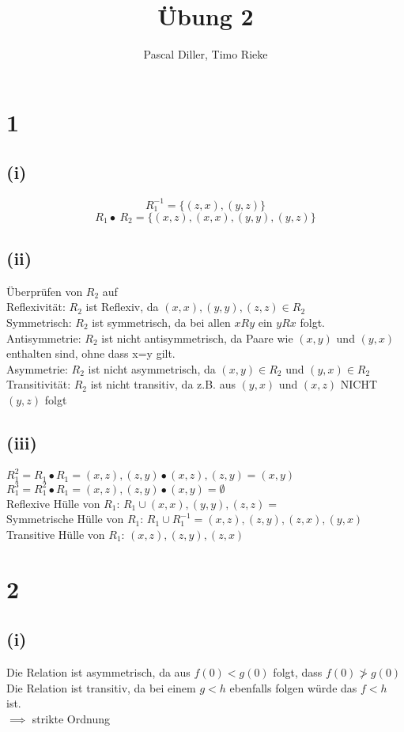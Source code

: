 \documentclass{article}
\title{Übung 2}
\author{Pascal Diller, Timo Rieke}
\begin{document}
\maketitle

\section{1}
\subsection{(i)}
\[R_1^{-1} = \{(z,x),(y,z)\}\]
\[R_1 \bullet\ R_2 = \{(x,z),(x,x),(y,y),(y,z)\}\]
\subsection{(ii)}
Überprüfen von $R_2$ auf \\
Reflexivität: 
$R_2$ ist Reflexiv, da $(x,x),(y,y),(z,z) \in R_2$ \\ 
Symmetrisch: 
$R_2$ ist symmetrisch, da bei allen $xRy$ ein $yRx$ folgt. \\
Antisymmetrie: 
$R_2$ ist nicht antisymmetrisch, da Paare wie $(x,y)$ und $(y,x)$ enthalten sind, ohne dass x=y gilt. \\
Asymmetrie: 
$R_2$ ist nicht asymmetrisch, da $(x,y) \in R_2$ und $(y,x) \in R_2$ \\ 
Transitivität:
$R_2$ ist nicht transitiv, da z.B. aus $(y,x)$ und $(x,z)$ NICHT $(y,z)$ folgt
\subsection{(iii)}
$R_1^{2} = R_1 \bullet R_1 = {(x,z),(z,y)} \bullet {(x,z),(z,y)} = {(x,y)}$ \\
$R_1^{3} = R_1^{2} \bullet R_1 = {(x,z),(z,y)} \bullet {(x,y)} = \emptyset$  \\
Reflexive Hülle von $R_1$: $R_1 \cup {(x,x),(y,y),(z,z)} =$ \\
Symmetrische Hülle von $R_1$: $R_1 \cup R_1^{-1} = {(x,z),(z,y),(z,x),(y,x)}$ \\
Transitive Hülle von $R_1$: ${(x,z),(z,y),(z,x)}$

\section{2}
\subsection{(i)}
Die Relation ist asymmetrisch, da aus $f(0) < g(0)$ folgt, dass $f(0) \ngtr g(0)$ \\
Die Relation ist transitiv, da bei einem $g<h$ ebenfalls folgen würde das $f<h$ ist. \\
$\implies$ strikte Ordnung
\end{document}
